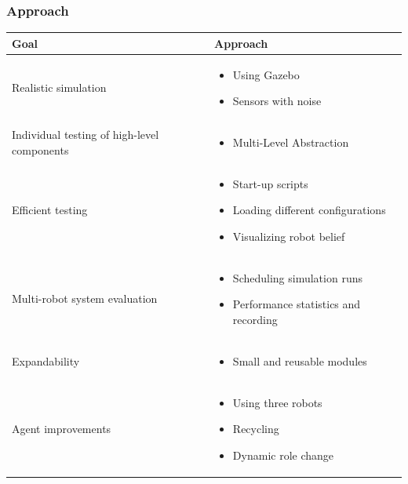 \documentclass[]{beamer}
\begin{document}
\begin{frame}
  \frametitle{Approach}
  \begin{tabular}{p{3.7cm}|p{7.5cm}}
    \hline
    \large{\textbf{Goal}} & \large{\textbf{Approach}}\\
    \hline
    Realistic simulation & \begin{itemize} \item Using Gazebo \item Sensors with noise \end{itemize} \pause \\ %
    \hline
    Individual testing of high-level components & \begin{itemize} \item Multi-Level Abstraction \end{itemize} \pause \\ %
    \hline
    Efficient testing & \begin{itemize} \item Start-up scripts \item Loading different configurations \item Visualizing robot belief \end{itemize} \pause \\ %
    \hline
    Multi-robot system evaluation & \begin{itemize} \item Scheduling simulation runs \item Performance statistics and recording \end{itemize} \pause \\ %
    \hline
    Expandability & \begin{itemize} \item Small and reusable modules \end{itemize} \pause \\ %
    \hline
    Agent improvements & \begin{itemize} \item Using three robots \item Recycling \item Dynamic role change \end{itemize} \pause \\ %
    \hline    
  \end{tabular}
\end{frame}
\end{document}
